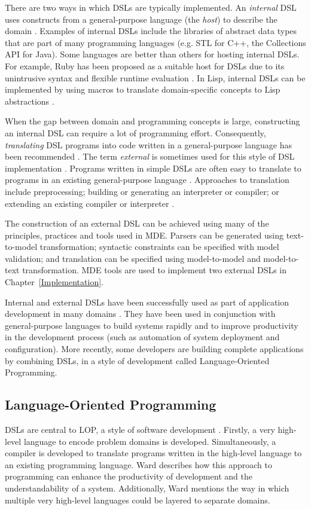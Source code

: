 There are two ways in which DSLs are typically implemented. An \emph{internal} DSL uses constructs from a general-purpose language (the \emph{host}) to describe the domain \cite{fowler10dsls}. Examples of internal DSLs include the libraries of abstract data types that are part of many programming languages (e.g. STL for C++, the Collections API for Java). Some languages are better than others for hosting internal DSLs. For \cc example, Ruby has been proposed as a suitable host for DSLs due to its unintrusive syntax and flexible runtime evaluation \cite[ch. 4]{fowler10dsls}. In Lisp, internal DSLs can be implemented by using macros to translate domain-specific concepts to Lisp abstractions \cite{graham93lisp}.

When the gap between domain and programming concepts is large, constructing an internal DSL can require a lot of programming effort. Consequently, \cc \emph{translating} DSL programs into code written in a general-purpose language has been recommended \cite{parr07antlr}. The \cc term \emph{external} is sometimes used for this style of DSL implementation \cite{fowler10dsls}. Programs written in simple DSLs are often easy to translate to programs in an existing general-purpose language \cite{parr07antlr}. Approaches to translation include preprocessing; building or generating an interpreter or compiler; or extending an existing compiler or interpreter \cite{fowler10dsls}.

The construction of an external DSL can be achieved using many of the principles, practices and tools used in MDE. Parsers can be generated using text-to-model transformation; syntactic constraints can be specified with model validation; and translation can be specified using model-to-model and model-to-text transformation. MDE tools are used to implement two external DSLs in Chapter~\ref{Implementation}.

Internal \cc and external DSLs have been successfully used as part of application development in many domains \cite{deursen00dslbib}. They have been used in conjunction with general-purpose languages to build systems rapidly and to improve productivity in the development process (such as automation of system deployment and configuration). More recently, some developers are building complete applications by combining DSLs, in a style of development called Language-Oriented Programming. 

\subsection{Language-Oriented Programming}
DSLs \cc are central to LOP, a style of software development \cite{ward94lop}. Firstly, a very high-level language to encode problem domains is developed. Simultaneously, a compiler is developed to translate programs written in the high-level language to an existing programming language. Ward describes how this approach to programming can enhance the productivity of development and the understandability of a system. Additionally, Ward mentions the way in which multiple very high-level languages could be layered to separate domains.

